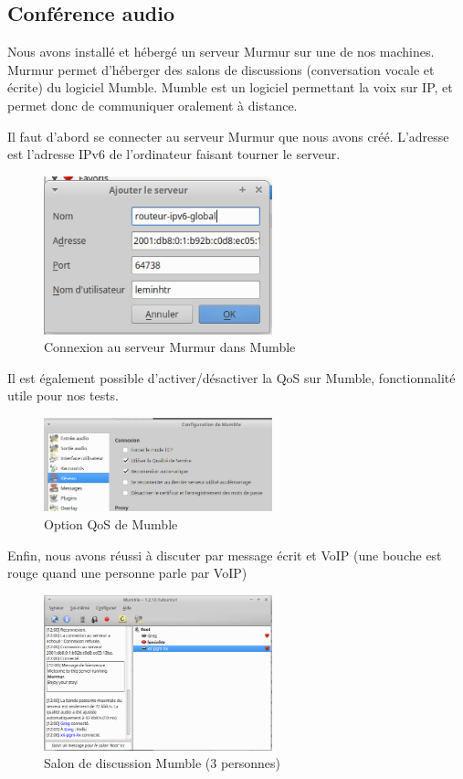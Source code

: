	\subsection{Conférence audio}
    
    	Nous avons installé et hébergé un serveur Murmur sur une de nos machines. Murmur permet d'héberger des salons de discussions (conversation vocale et écrite) du logiciel Mumble. Mumble est un logiciel permettant la voix sur IP, et permet donc de communiquer oralement à distance. 

Il faut d'abord se connecter au serveur Murmur que nous avons créé. L'adresse est l'adresse IPv6 de l'ordinateur faisant tourner le serveur.
        \begin{figure}[h]
        \includegraphics[width=250px]{figures/mumble-config.png}
        \centering
        \caption{Connexion au serveur Murmur dans Mumble}
        \end{figure}
        
Il est également possible d'activer/désactiver la QoS sur Mumble, fonctionnalité utile pour nos tests.

        \begin{figure}[h]
        \includegraphics[width=250px]{figures/qos-mumble-config2.png}
        \centering
        \caption{Option QoS de Mumble}
        \end{figure}


Enfin, nous avons réussi à discuter par message écrit et VoIP (une bouche est rouge quand une personne parle par VoIP)

        \begin{figure}[h]
        \includegraphics[width=250px]{figures/qos-mumble-talk.png}
        \centering
        \caption{Salon de discussion Mumble (3 personnes)}
        \end{figure}
        
